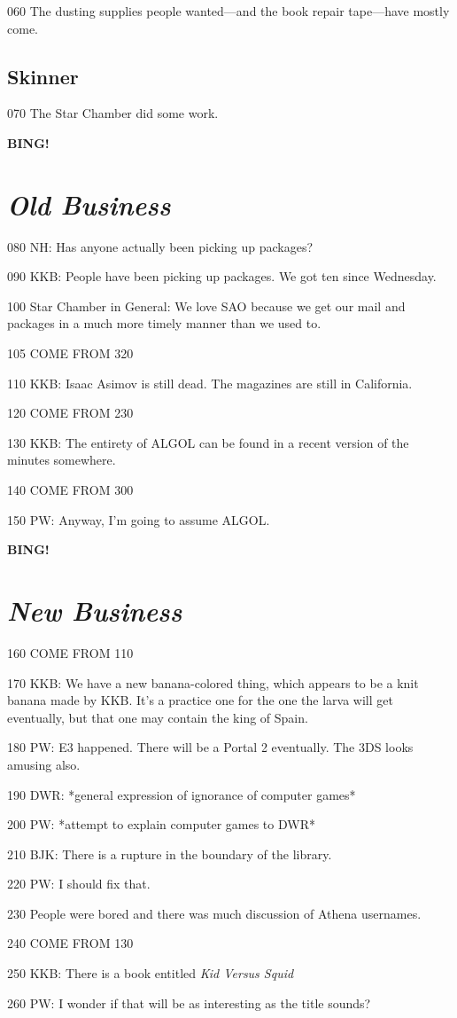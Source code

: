 \documentclass[10pt]{article}
\newcommand{\bing}{{\bf BING!} }
\newcommand{\goto}[1]{\bing \vskip 12pt \section*{{\em{#1}}}}
\begin{document}
060 The dusting supplies people wanted---and the book repair tape---have mostly
come.

\subsection*{Skinner}

070 The Star Chamber did some work.

\goto{Old Business}

080 NH: Has anyone actually been picking up packages?

090 KKB: People have been picking up packages.  We got ten since Wednesday.

100 Star Chamber in General: We love SAO because we get our mail and
packages in a much more timely manner than we used to.

105 COME FROM 320

110 KKB: Isaac Asimov is still dead.  The magazines are still in California.

120 COME FROM 230

130 KKB: The entirety of ALGOL can be found in a recent version of the minutes
somewhere.

140 COME FROM 300

150 PW: Anyway, I'm going to assume ALGOL.

\goto{New Business}

160 COME FROM 110

170 KKB: We have a new banana-colored thing, which appears to be a knit
banana made by KKB.  It's a practice one for the one the larva will
get eventually, but that one may contain the king of Spain.

180 PW: E3 happened.  There will be a Portal 2 eventually.  The 3DS looks
amusing also.

190 DWR: *general expression of ignorance of computer games*

200 PW: *attempt to explain computer games to DWR*

210 BJK: There is a rupture in the boundary of the library.

220 PW: I should fix that.

230 People were bored and there was much discussion of Athena usernames.

240 COME FROM 130

250 KKB: There is a book entitled \emph{Kid Versus Squid}

260 PW: I wonder if that will be as interesting as the title sounds?
\end{document}
